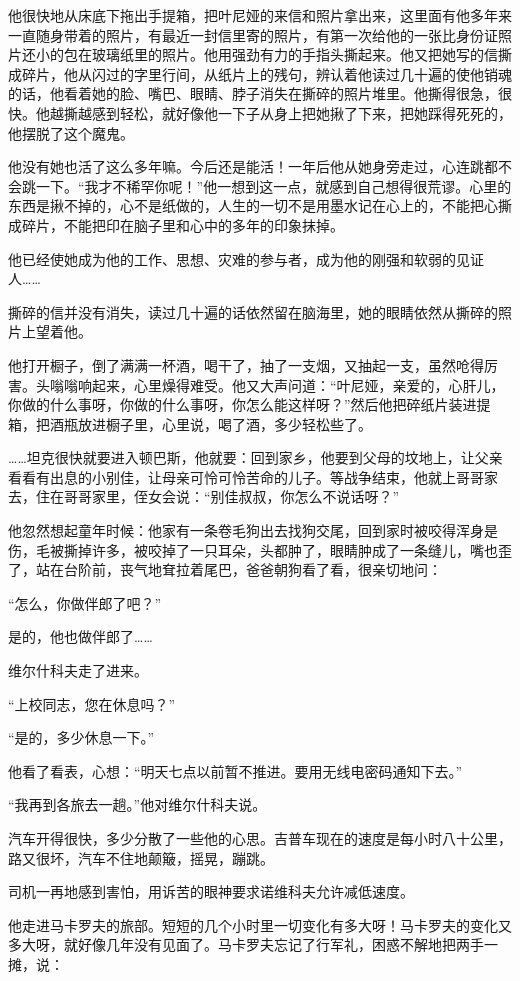他很快地从床底下拖出手提箱，把叶尼娅的来信和照片拿出来，这里面有他多年来一直随身带着的照片，有最近一封信里寄的照片，有第一次给他的一张比身份证照片还小的包在玻璃纸里的照片。他用强劲有力的手指头撕起来。他又把她写的信撕成碎片，他从闪过的字里行间，从纸片上的残句，辨认着他读过几十遍的使他销魂的话，他看着她的脸、嘴巴、眼睛、脖子消失在撕碎的照片堆里。他撕得很急，很快。他越撕越感到轻松，就好像他一下子从身上把她揪了下来，把她踩得死死的，他摆脱了这个魔鬼。

他没有她也活了这么多年嘛。今后还是能活！一年后他从她身旁走过，心连跳都不会跳一下。“我才不稀罕你呢！”他一想到这一点，就感到自己想得很荒谬。心里的东西是揪不掉的，心不是纸做的，人生的一切不是用墨水记在心上的，不能把心撕成碎片，不能把印在脑子里和心中的多年的印象抹掉。

他已经使她成为他的工作、思想、灾难的参与者，成为他的刚强和软弱的见证人……

撕碎的信并没有消失，读过几十遍的话依然留在脑海里，她的眼睛依然从撕碎的照片上望着他。

他打开橱子，倒了满满一杯酒，喝干了，抽了一支烟，又抽起一支，虽然呛得厉害。头嗡嗡响起来，心里燥得难受。他又大声问道：“叶尼娅，亲爱的，心肝儿，你做的什么事呀，你做的什么事呀，你怎么能这样呀？”然后他把碎纸片装进提箱，把酒瓶放进橱子里，心里说，喝了酒，多少轻松些了。

……坦克很快就要进入顿巴斯，他就要：回到家乡，他要到父母的坟地上，让父亲看看有出息的小别佳，让母亲可怜可怜苦命的儿子。等战争结束，他就上哥哥家去，住在哥哥家里，侄女会说：“别佳叔叔，你怎么不说话呀？”

他忽然想起童年时候：他家有一条卷毛狗出去找狗交尾，回到家时被咬得浑身是伤，毛被撕掉许多，被咬掉了一只耳朵，头都肿了，眼睛肿成了一条缝儿，嘴也歪了，站在台阶前，丧气地耷拉着尾巴，爸爸朝狗看了看，很亲切地问：

“怎么，你做伴郎了吧？”

是的，他也做伴郎了……

维尔什科夫走了进来。

“上校同志，您在休息吗？”

“是的，多少休息一下。”

他看了看表，心想：“明天七点以前暂不推进。要用无线电密码通知下去。”

“我再到各旅去一趟。”他对维尔什科夫说。

汽车开得很快，多少分散了一些他的心思。吉普车现在的速度是每小时八十公里，路又很坏，汽车不住地颠簸，摇晃，蹦跳。

司机一再地感到害怕，用诉苦的眼神要求诺维科夫允许减低速度。

他走进马卡罗夫的旅部。短短的几个小时里一切变化有多大呀！马卡罗夫的变化又多大呀，就好像几年没有见面了。马卡罗夫忘记了行军礼，困惑不解地把两手一摊，说：

